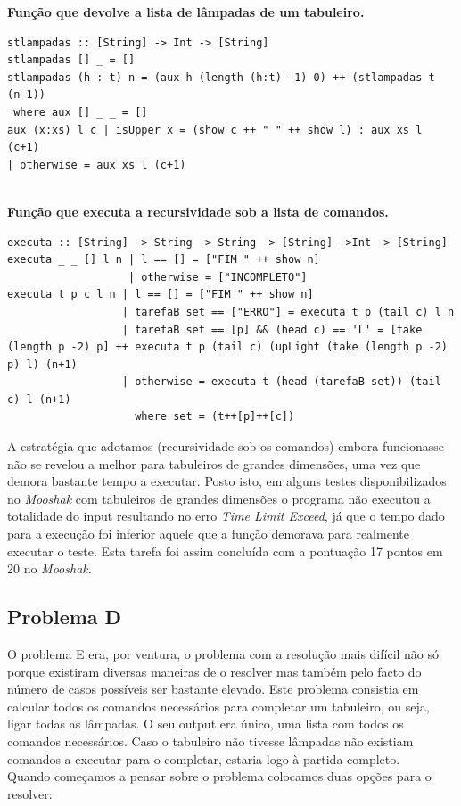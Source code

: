 \documentclass[a4paper,12pt,portuges]{article}
\begin{document}
\textbf{Função que devolve a lista de lâmpadas de um tabuleiro.} \\
\begin{verbatim}
stlampadas :: [String] -> Int -> [String]
stlampadas [] _ = []
stlampadas (h : t) n = (aux h (length (h:t) -1) 0) ++ (stlampadas t (n-1))
 where aux [] _ _ = []
aux (x:xs) l c | isUpper x = (show c ++ " " ++ show l) : aux xs l (c+1) 
| otherwise = aux xs l (c+1)
\end{verbatim}
\\
\textbf{Função que executa a recursividade sob a lista de comandos.} \\
\begin{verbatim}
executa :: [String] -> String -> String -> [String] ->Int -> [String]
executa _ _ [] l n | l == [] = ["FIM " ++ show n]
                   | otherwise = ["INCOMPLETO"]
executa t p c l n | l == [] = ["FIM " ++ show n]
                  | tarefaB set == ["ERRO"] = executa t p (tail c) l n 
                  | tarefaB set == [p] && (head c) == 'L' = [take (length p -2) p] ++ executa t p (tail c) (upLight (take (length p -2) p) l) (n+1)
                  | otherwise = executa t (head (tarefaB set)) (tail c) l (n+1)
                    where set = (t++[p]++[c])
\end{verbatim}


A estratégia que adotamos (recursividade sob os comandos) embora funcionasse não se revelou a melhor para tabuleiros de grandes dimensões, uma vez que demora bastante tempo a executar. Posto isto, em alguns testes disponibilizados no \textit{Mooshak} com tabuleiros de grandes dimensões o programa não executou a totalidade do input resultando no erro \textit{Time Limit Exceed}, já que o tempo dado para a execução foi inferior aquele que a função demorava para realmente executar o teste. Esta tarefa foi assim concluída com a pontuação 17 pontos em 20 no \textit{Mooshak}.\\

\subsection {Problema D}

O problema E era, por ventura, o problema com a resolução mais difícil não só porque existiram diversas maneiras de o resolver mas também pelo facto do número de casos possíveis ser bastante elevado. Este problema consistia em calcular todos os comandos necessários para completar um tabuleiro, ou seja, ligar todas as lâmpadas. O seu output era único, uma lista com todos os comandos necessários. Caso o tabuleiro não tivesse lâmpadas não existiam comandos a executar para o completar, estaria logo à partida completo.
\\
Quando começamos a pensar sobre o problema colocamos duas opções para o resolver:
\end{document}
